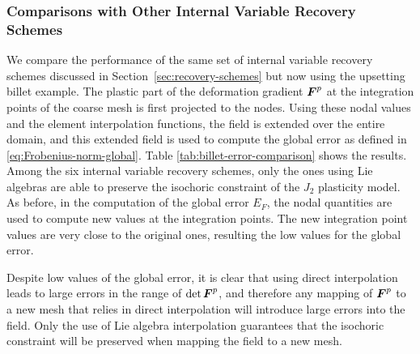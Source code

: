 \documentclass[12pt]{article}
\begin{document}
\subsubsection{Comparisons with Other Internal Variable Recovery Schemes}

We compare the performance of the same set of internal variable recovery schemes
discussed in Section~\ref{sec:recovery-schemes} but now using the upsetting
billet example. The plastic part of the deformation gradient ${\boldsymbol{F}}^{p}$ at the
integration points of the coarse mesh is first projected to the nodes. Using
these nodal values and the element interpolation functions, the field is
extended over the entire domain, and this extended field is used to compute the
global error as defined in \eqref{eq:Frobenius-norm-global}.
Table \ref{tab:billet-error-comparison} shows the results. Among the six
internal variable recovery schemes, only the ones using Lie algebras are able to
preserve the isochoric constraint of the $J_2$ plasticity model. As before, in
the computation of the global error $E_F$, the nodal quantities are used to
compute new values at the integration points. The new integration point values
are very close to the original ones, resulting the low values for the global
error.

Despite low values of the global error, it is clear that using direct
interpolation leads to large errors in the range of $\det {\boldsymbol{F}}^p$, and therefore
any mapping of ${\boldsymbol{F}}^p$ to a new mesh that relies in direct interpolation will
introduce large errors into the field. Only the use of Lie algebra interpolation
guarantees that the isochoric constraint will be preserved when mapping the
field to a new mesh.
 
\end{document}
